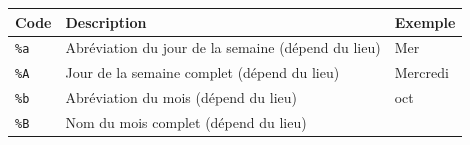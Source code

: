 \documentclass[
  11pt,
]{book}
\numberwithin{equation}{section}
\numberwithin{countremarque}{section}
\begin{document}
\begin{longtable}[]{@{}lll@{}}
\toprule
\begin{minipage}[b]{0.20\columnwidth}\raggedright
Code\strut
\end{minipage} & \begin{minipage}[b]{0.42\columnwidth}\raggedright
Description\strut
\end{minipage} & \begin{minipage}[b]{0.29\columnwidth}\raggedright
Exemple\strut
\end{minipage}\tabularnewline
\midrule
\endhead
\begin{minipage}[t]{0.20\columnwidth}\raggedright
\texttt{\%a}\strut
\end{minipage} & \begin{minipage}[t]{0.42\columnwidth}\raggedright
Abréviation du jour de la semaine (dépend du lieu)\strut
\end{minipage} & \begin{minipage}[t]{0.29\columnwidth}\raggedright
Mer\strut
\end{minipage}\tabularnewline
\begin{minipage}[t]{0.20\columnwidth}\raggedright
\texttt{\%A}\strut
\end{minipage} & \begin{minipage}[t]{0.42\columnwidth}\raggedright
Jour de la semaine complet (dépend du lieu)\strut
\end{minipage} & \begin{minipage}[t]{0.29\columnwidth}\raggedright
Mercredi\strut
\end{minipage}\tabularnewline
\begin{minipage}[t]{0.20\columnwidth}\raggedright
\texttt{\%b}\strut
\end{minipage} & \begin{minipage}[t]{0.42\columnwidth}\raggedright
Abréviation du mois (dépend du lieu)\strut
\end{minipage} & \begin{minipage}[t]{0.29\columnwidth}\raggedright
oct\strut
\end{minipage}\tabularnewline
\begin{minipage}[t]{0.20\columnwidth}\raggedright
\texttt{\%B}\strut
\end{minipage} & \begin{minipage}[t]{0.42\columnwidth}\raggedright
Nom du mois complet (dépend du lieu)\strut
\end{minipage} & \begin{minipage}[t]{0.29\columnwidth}\raggedright

\end{minipage}
\end{longtable}
\end{document}
